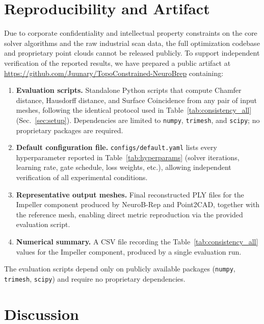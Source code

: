 \documentclass{ieeeaccess}
\begin{document}
\section{Reproducibility and Artifact}
\label{sec:artifact}
Due to corporate confidentiality and intellectual property constraints
on the core solver algorithms and the raw industrial scan data,
the full optimization codebase and proprietary point clouds cannot be
released publicly.
To support independent verification of the reported results, we have
prepared a public artifact at
\url{https://github.com/Juunary/TopoConstrained-NeuroBrep}
containing:
\begin{enumerate}
  \item \textbf{Evaluation scripts.} Standalone Python scripts that compute
        Chamfer distance, Hausdorff distance, and Surface Coincidence
        from any pair of input meshes, following the identical protocol
        used in Table~\ref{tab:consistency_all} (Sec.~\ref{sec:setup}).
        Dependencies are limited to \texttt{numpy}, \texttt{trimesh},
        and \texttt{scipy}; no proprietary packages are required.
  \item \textbf{Default configuration file.}
        \texttt{configs/default.yaml} lists every hyperparameter reported
        in Table~\ref{tab:hyperparams} (solver iterations, learning rate,
        gate schedule, loss weights, etc.), allowing independent
        verification of all experimental conditions.
  \item \textbf{Representative output meshes.} Final reconstructed PLY files
        for the Impeller component produced by NeuroB-Rep and Point2CAD,
        together with the reference mesh, enabling direct metric
        reproduction via the provided evaluation script.
  \item \textbf{Numerical summary.} A CSV file recording the
        Table~\ref{tab:consistency_all} values for the Impeller component,
        produced by a single evaluation run.
\end{enumerate}
The evaluation scripts depend only on publicly available packages
(\texttt{numpy}, \texttt{trimesh}, \texttt{scipy}) and require no
proprietary dependencies.


\section{Discussion}
\label{sec:discussion}
\end{document}
